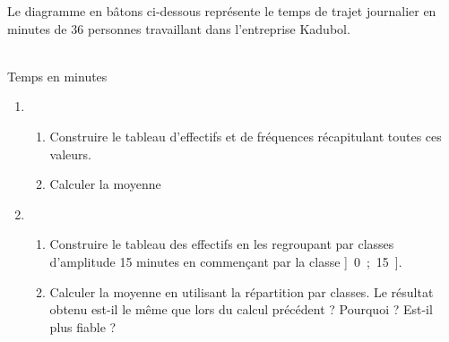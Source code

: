 \begin{exercice*}
   Le diagramme en bâtons ci-dessous représente le temps de trajet journalier en minutes de 36 personnes travaillant dans l'entreprise Kadubol.
   \begin{center}
      {\footnotesize  
    \\ [-2mm]
   \hspace*{50mm} Temps en minutes}
   \end{center}  
   \vspace*{-5mm}
   \begin{enumerate}
      \item
      \begin{enumerate}
         \item Construire le tableau d'effectifs et de fréquences récapitulant toutes ces valeurs.
         \item Calculer la moyenne
      \end{enumerate}
      \item
      \begin{enumerate}
         \item Construire le tableau des effectifs en les regroupant par classes d'amplitude 15 minutes en commençant par la classe ]~0~;~15~].
         \item Calculer la moyenne en utilisant la répartition par classes. Le résultat obtenu est-il le même que lors du calcul précédent ? Pourquoi ? Est-il plus fiable ?
      \end{enumerate}
   \end{enumerate}
\end{exercice*}

